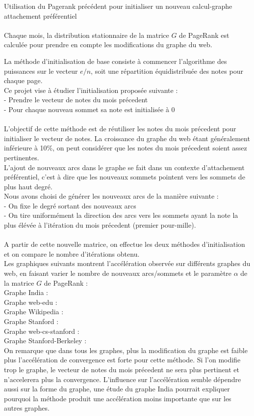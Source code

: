 \documentclass[a4paper]{article}
\begin{document}
Utilisation du Pagerank précédent pour initialiser un nouveau calcul-graphe attachement préférentiel
\\
\\
Chaque mois, la distribution stationnaire de la matrice $G$ de PageRank est calculée pour prendre en compte les modifications du graphe du web.

La méthode d'initialisation de base consiste à commencer l'algorithme des puissances sur le vecteur $e/n$, soit une répartition équidistribuée des notes pour chaque page.
\\
Ce projet vise à étudier l'initialisation proposée suivante :
\\
- Prendre le vecteur de notes du mois précedent
\\
- Pour chaque nouveau sommet sa note est initialisée à 0
\\
\\
L'objectif de cette méthode est de réutiliser les notes du mois précedent pour initialiser le vecteur de notes.
La croissance du graphe du web étant généralement inférieure à 10\%, on peut considérer que les notes du mois précedent soient assez pertinentes.
\\ 
L'ajout de nouveaux arcs dans le graphe se fait dans un contexte d'attachement préférentiel, c'est à dire que les nouveaux sommets pointent vers les sommets de plus haut degré.
\\
Nous avons choisi de générer les nouveaux arcs de la manière suivante :
\\
- On fixe le degré sortant des nouveaux arcs
\\
- On tire uniformément la direction des arcs vers les sommets ayant la note la plus élévée à l'itération du mois précedent (premier pour-mille).
\\
\\
A partir de cette nouvelle matrice, on effectue les deux méthodes d'initialisation et on compare le nombre d'itérations obtenu.
\\
Les graphiques suivants montrent l'accélération observée sur différents graphes du web, en faisant varier le nombre de nouveaux arcs/sommets et le paramètre $\alpha$ de la matrice $G$ de PageRank :
\\
Graphe India :
\\
Graphe web-edu :
\\
Graphe Wikipedia :
\\
Graphe Stanford :
\\
Graphe web-cs-stanford :
\\
Graphe Stanford-Berkeley :
\\
On remarque que dans tous les graphes, plus la modification du graphe est faible plus l'accélération de convergence est forte pour cette méthode.
Si l'on modifie trop le graphe, le vecteur de notes du mois précedent ne sera plus pertinent et n'accelerera plus la convergence.
L'influence sur l'accélération semble dépendre aussi sur la forme du graphe, une étude du graphe India pourrait expliquer pourquoi la méthode produit une accélération moins importante que sur les autres graphes.
\end{document}

